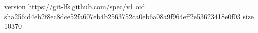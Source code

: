 version https://git-lfs.github.com/spec/v1
oid sha256:d4eb2f8ec8dce52fa607eb4b2563752ca0eb6a08a9f964eff2e53623418e0f03
size 10370
